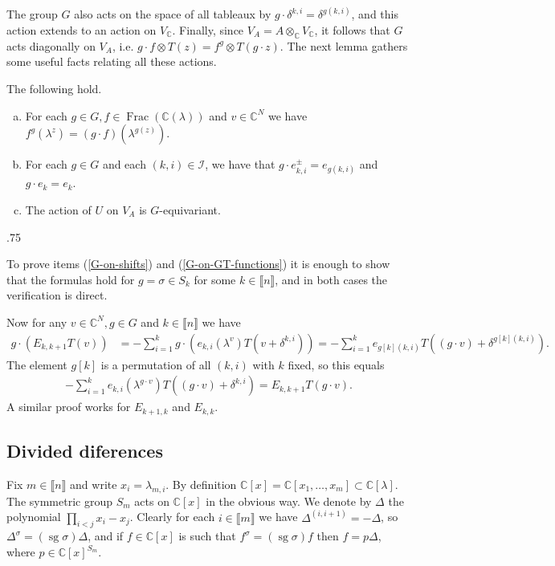 \documentclass[11pt,fleqn]{article}
\makeatletter
\newcounter{para}[section]
\renewenvironment{proof}[1][\textit{Proof}]{\par
  \pushQED{\qed}%
  \normalfont \topsep.75\paraskip\relax
  \trivlist
  \item[\hskip\labelsep
        \itshape
    #1\@addpunct{.}]\ignorespaces
}{%
  \popQED\endtrivlist\@endpefalse
}
\newcommand\CC{\mathbb C}
\newcommand\I{\mathcal I}
\newcommand\ot{\otimes}
\newcommand\interval[1]{\llbracket #1 \rrbracket}
\DeclareMathOperator\sg{sg}
\DeclareMathOperator\Frac{Frac}
\makeatother
\begin{document}
The group $G$ also acts on the space of all tableaux by $g \cdot \delta^{k,i} 
= \delta^{g(k,i)}$, and this action extends to an action on $V_\CC$. Finally,
since $V_A = A \ot_\CC V_\CC$, it follows that $G$ acts diagonally on $V_A$,
i.e. $g \cdot f \ot T(z) = f^g \ot T(g \cdot z)$. The next lemma gathers
some useful facts relating all these actions.

\begin{Lemma}
The following hold.
\label{L:G-equivariant}
\begin{enumerate}[(a)]
\item \label{G-on-shifts}
For each $g \in G, f \in \Frac(\CC(\lambda))$ and $v \in \CC^N$ we have
$f^g (\lambda^z) = (g \cdot f)(\lambda^{g(z)})$.

\item \label{G-on-GT-functions}
For each $g \in G$ and each $(k,i) \in \I$, we have that $g \cdot 
e_{k,i}^\pm = e_{g(k,i)}$ and $g \cdot e_k = e_k$.

\item \label{G-U-equivariant}
The action of $U$ on $V_A$ is $G$-equivariant.
\end{enumerate}
\end{Lemma}
\begin{proof}
To prove items (\ref{G-on-shifts}) and (\ref{G-on-GT-functions}) it is enough 
to show that the formulas hold for $g = \sigma \in S_k$ for some $k \in 
\interval n$, and in both cases the verification is direct. 

Now for any $v \in \CC^N, g \in G$ and $k \in \interval n$ we have
\begin{align*}
g \cdot (E_{k,k+1} T(v))
  &= - \sum_{i = 1}^k g \cdot 
    \left(e_{k,i}(\lambda^v) T(v + \delta^{k,i}) \right)
    = -\sum_{i=1}^k e_{g[k](k,i)} T((g \cdot v)+\delta^{g[k](k,i)}).
\end{align*}
The element $g[k]$ is a permutation of all $(k,i)$ with $k$ fixed, so this 
equals
\begin{align*}
- \sum_{i=1}^k e_{k,i}(\lambda^{g \cdot v}) T((g \cdot v)+\delta^{k,i}) = 
E_{k,k+1} T(g \cdot v).
\end{align*}
A similar proof works for $E_{k+1,k}$ and $E_{k,k}$.
\end{proof}

\subsection{Divided diferences}
Fix $m \in \interval{n}$ and write $x_i = \lambda_{m,i}$. By definition $\CC[x]
= \CC[x_1, \ldots, x_m] \subset \CC[\lambda]$. The symmetric group $S_m$ acts 
on $\CC[x]$ in the obvious way. We denote by $\Delta$ the polynomial
$\prod_{i<j} x_i - x_j$. Clearly for each $i \in \interval m$ we have 
$\Delta^{(i,i+1)} = - \Delta$, so $\Delta^\sigma = (\sg \sigma) \Delta$, and
if $f \in \CC[x]$ is such that $f^\sigma = (\sg \sigma) f$ then $f = p \Delta$,
where $p \in \CC[x]^{S_m}$.
\end{document}
